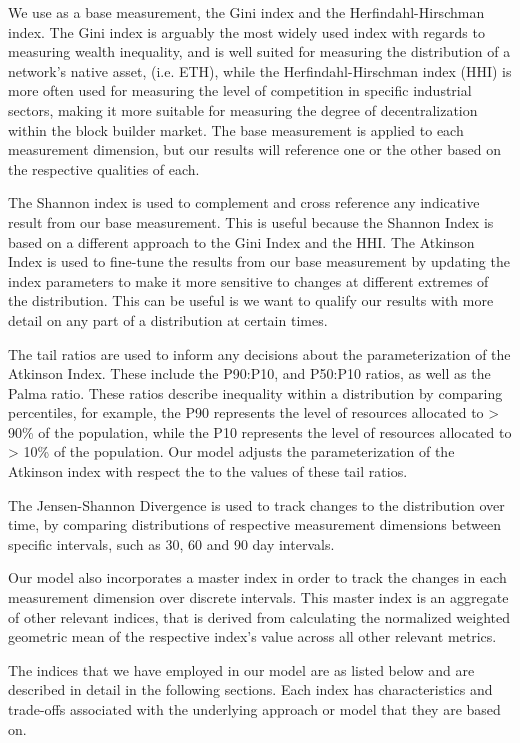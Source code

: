 \documentclass[conference]{IEEEtran}
\begin{document}
We use as a base measurement, the Gini index and the Herfindahl-Hirschman index. The Gini index is arguably the most widely used index with regards to measuring wealth inequality, and is well suited for measuring the distribution of a network's native asset, (i.e. ETH), while the Herfindahl-Hirschman index (HHI) is more often used for measuring the level of competition in specific industrial sectors, making it more suitable for measuring the degree of decentralization within the block builder market.  The base measurement is applied to each measurement dimension, but our results will reference one or the other based on the respective qualities of each.

The Shannon index is used to complement and cross reference any indicative result from our base measurement.  This is useful because the Shannon Index is based on a different approach to the Gini Index and the HHI.  The Atkinson Index is used to fine-tune the results from our base measurement by updating the index parameters to make it more sensitive to changes at different extremes of the distribution.  This can be useful is we want to qualify our results with more detail on any part of a distribution at certain times.

The tail ratios are used to inform any decisions about the parameterization of the Atkinson Index.  These include the P90:P10, and P50:P10 ratios, as well as the Palma ratio.  These ratios describe inequality within a distribution by comparing percentiles, for example, the P90 represents the level of resources allocated to > 90\% of the population, while the P10 represents the level of resources allocated to > 10\% of the population.  Our model adjusts the parameterization of the Atkinson index with respect the to the values of these tail ratios.

The Jensen-Shannon Divergence is used to track changes to the distribution over time, by comparing distributions of respective measurement dimensions between specific intervals, such as 30, 60 and 90 day intervals.

Our model also incorporates a master index in order to track the changes in each measurement dimension over discrete intervals.  This master index is an aggregate of other relevant indices, that is derived from calculating the normalized weighted geometric mean of the respective index's value across all other relevant metrics.

The indices that we have employed in our model are as listed below and are described in detail in the following sections.  Each index has characteristics and trade-offs associated with the underlying approach or model that they are based on.
\end{document}
